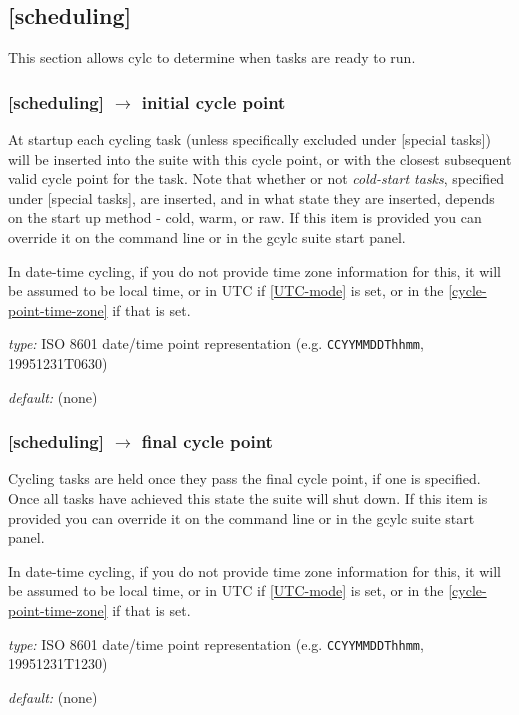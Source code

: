 \subsection{[scheduling]}

This section allows cylc to determine when tasks are ready to run.

\subsubsection[initial cycle point]{[scheduling] $\rightarrow$ initial cycle point}

At startup each cycling task (unless specifically excluded under
[special tasks]) will be inserted into the suite with this cycle point,
or with the closest subsequent valid cycle point for the task. Note that
whether or not {\em cold-start tasks}, specified under [special tasks],
are inserted, and in what state they are inserted, depends on the start
up method - cold, warm, or raw.  If this item is provided you can
override it on the command line or in the gcylc suite start panel.

In date-time cycling, if you do not provide time zone information for this,
it will be assumed to be local time, or in UTC if \ref{UTC-mode} is set, or in
the \ref{cycle-point-time-zone} if that is set.

\begin{myitemize}
    \item {\em type:} ISO 8601 date/time point representation (e.g.
 \lstinline=CCYYMMDDThhmm=, 19951231T0630)
    \item {\em default:} (none)
\end{myitemize}

\subsubsection[final cycle point]{[scheduling] $\rightarrow$ final cycle point}

Cycling tasks are held once they pass the final cycle point, if one is
specified. Once all tasks have achieved this state the suite will shut
down. If this item is provided you can override it on the command line
or in the gcylc suite start panel.

In date-time cycling, if you do not provide time zone information for this,
it will be assumed to be local time, or in UTC if \ref{UTC-mode} is set, or in
the \ref{cycle-point-time-zone} if that is set.

\begin{myitemize}
    \item {\em type:} ISO 8601 date/time point representation (e.g.
 \lstinline=CCYYMMDDThhmm=, 19951231T1230)
    \item {\em default:} (none)
\end{myitemize}

